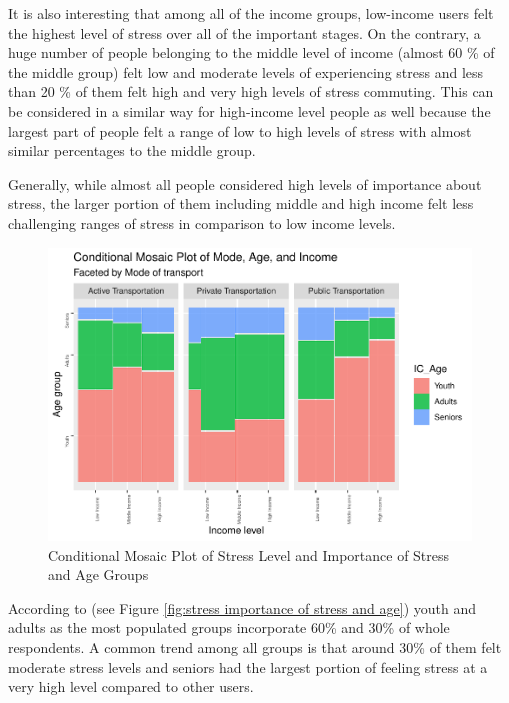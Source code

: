 \documentclass[
11pt, %
oneside, %
english, %
singlespacing, %
]{macthesis} %
\begin{document}
It is also interesting that among all of the income groups, low-income users felt the highest level of stress over all of the important stages. On the contrary, a huge number of people belonging to the middle level of income (almost 60 \% of the middle group) felt low and moderate levels of experiencing stress and less than 20 \% of them felt high and very high levels of stress commuting. This can be considered in a similar way for high-income level people as well because the largest part of people felt a range of low to high levels of stress with almost similar percentages to the middle group.

Generally, while almost all people considered high levels of importance about stress, the larger portion of them including middle and high income felt less challenging ranges of stress in comparison to low income levels.
\begin{figure}
\includegraphics[width=0.85\linewidth]{thesis_files/figure-latex/unnamed-chunk-29-1} \caption{\label{fig:stress importance of stress and age}Conditional Mosaic Plot of Stress Level and Importance of Stress and Age Groups}\label{fig:unnamed-chunk-29}
\end{figure}
According to (see Figure \ref{fig:stress importance of stress and age}) youth and adults as the most populated groups incorporate 60\% and 30\% of whole respondents. A common trend among all groups is that around 30\% of them felt moderate stress levels and seniors had the largest portion of feeling stress at a very high level compared to other users.
\end{document}
